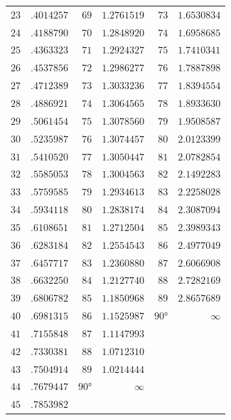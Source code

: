 \documentclass[11pt,a4paper]{book}
\begin{document}
\begin{center}
\begin{tabular}{r|r|r|r|r|r}
$23$ & $.4014257$ & $69$ & $1.2761519$ & $73$ & $1.6530834$ \\
$24$ & $.4188790$ & $70$ & $1.2848920$ & $74$ & $1.6958685$ \\
$25$ & $.4363323$ & $71$ & $1.2924327$ & $75$ & $1.7410341$ \\
$26$ & $.4537856$ & $72$ & $1.2986277$ & $76$ & $1.7887898$ \\
$27$ & $.4712389$ & $73$ & $1.3033236$ & $77$ & $1.8394554$ \\
$28$ & $.4886921$ & $74$ & $1.3064565$ & $78$ & $1.8933630$ \\
$29$ & $.5061454$ & $75$ & $1.3078560$ & $79$ & $1.9508587$ \\
$30$ & $.5235987$ & $76$ & $1.3074457$ & $80$ & $2.0123399$ \\
$31$ & $.5410520$ & $77$ & $1.3050447$ & $81$ & $2.0782854$ \\
$32$ & $.5585053$ & $78$ & $1.3004563$ & $82$ & $2.1492283$ \\
$33$ & $.5759585$ & $79$ & $1.2934613$ & $83$ & $2.2258028$ \\
$34$ & $.5934118$ & $80$ & $1.2838174$ & $84$ & $2.3087094$ \\
$35$ & $.6108651$ & $81$ & $1.2712504$ & $85$ & $2.3989343$ \\
$36$ & $.6283184$ & $82$ & $1.2554543$ & $86$ & $2.4977049$ \\
$37$ & $.6457717$ & $83$ & $1.2360880$ & $87$ & $2.6066908$ \\
$38$ & $.6632250$ & $84$ & $1.2127740$ & $88$ & $2.7282169$ \\
$39$ & $.6806782$ & $85$ & $1.1850968$ & $89$ & $2.8657689$ \\
$40$ & $.6981315$ & $86$ & $1.1525987$ & $90°$ & $\infty$ \\
$41$ & $.7155848$ & $87$ & $1.1147993$ & & \\
$42$ & $.7330381$ & $88$ & $1.0712310$ & & \\
$43$ & $.7504914$ & $89$ & $1.0214444$ & & \\
$44$ & $.7679447$ & $90°$ & $\infty$ & & \\
$45$ & $.7853982$ & & & &
\end{tabular}
\end{center}

\vspace{2em}

\end{document}
